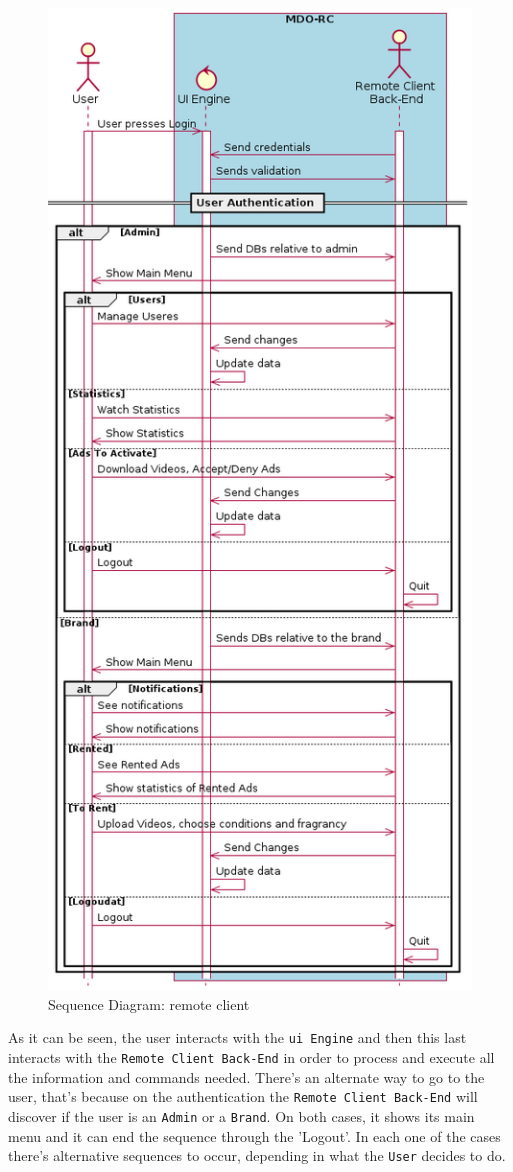 \begin{figure}[htb!]
\centering
    \includegraphics[width=0.5\columnwidth]{./img/seq-rc.png}
  \caption{Sequence Diagram: remote client}%
\label{fig:seq-rc}
\end{figure}

As it can be seen, the user interacts with the \texttt{\gls{ui} Engine} and then this last interacts with the \texttt{Remote Client Back-End} in order to process and execute all the information and commands needed. 
There's an alternate way to go to the user, that's because on the authentication the \texttt{Remote Client Back-End} will discover if the user is an \texttt{Admin} or a \texttt{Brand}.
On both cases, it shows its main menu and it can end the sequence through the 'Logout'.
In each one of the cases there's alternative sequences to occur, depending in what the \texttt{User} decides to do.

